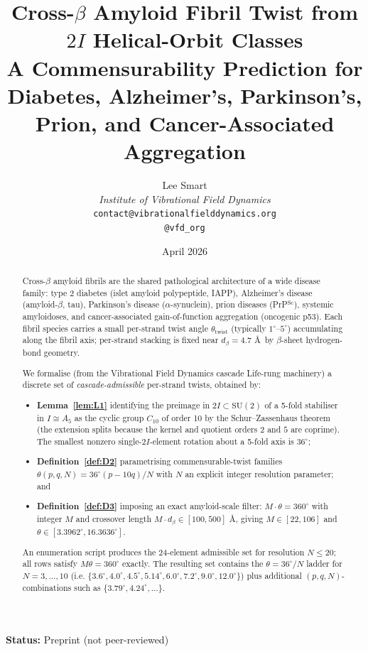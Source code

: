 \documentclass[12pt]{article}
\title{Cross-$\beta$ Amyloid Fibril Twist from $2I$ Helical-Orbit Classes\\[6pt]
\large A Commensurability Prediction for Diabetes, Alzheimer's, Parkinson's, Prion, and Cancer-Associated Aggregation}
\author{%
  Lee Smart\\[4pt]
  \textit{Institute of Vibrational Field Dynamics}\\[2pt]
  \texttt{contact@vibrationalfielddynamics.org}\\[2pt]
  \texttt{@vfd\_org}%
}
\date{April 2026}
\begin{document}
\maketitle

\noindent\textbf{Status:} Preprint (not peer-reviewed)

\begin{abstract}
Cross-$\beta$ amyloid fibrils are the shared pathological
architecture of a wide disease family: type 2 diabetes (islet
amyloid polypeptide, IAPP), Alzheimer's disease (amyloid-$\beta$,
tau), Parkinson's disease ($\alpha$-synuclein), prion diseases
(PrP$^{\mathrm{Sc}}$), systemic amyloidoses, and cancer-associated
gain-of-function aggregation (oncogenic p53). Each fibril species
carries a small per-strand twist angle $\theta_{\mathrm{twist}}$
(typically $1^{\circ}$--$5^{\circ}$) accumulating along the fibril
axis; per-strand stacking is fixed near $d_\beta = 4.7$ \AA\ by
$\beta$-sheet hydrogen-bond geometry.

We formalise (from the Vibrational Field Dynamics cascade
Life-rung machinery) a discrete set of \emph{cascade-admissible}
per-strand twists, obtained by:

\begin{itemize}
\item \textbf{Lemma~\ref{lem:L1}} identifying the preimage in
  $2I \subset \mathrm{SU}(2)$ of a 5-fold stabiliser in
  $I \cong A_5$ as the cyclic group $C_{10}$ of order 10 by the
  Schur--Zassenhaus theorem (the extension splits because the
  kernel and quotient orders $2$ and $5$ are coprime). The
  smallest nonzero single-$2I$-element rotation about a 5-fold
  axis is $36^{\circ}$;
\item \textbf{Definition~\ref{def:D2}} parametrising
  commensurable-twist families $\theta(p, q, N) = 36^{\circ}
  (p - 10q)/N$ with $N$ an explicit integer resolution
  parameter; and
\item \textbf{Definition~\ref{def:D3}} imposing an exact
  amyloid-scale filter: $M \cdot \theta = 360^{\circ}$ with
  integer $M$ and crossover length $M \cdot d_\beta \in [100, 500]$
  \AA, giving $M \in [22, 106]$ and
  $\theta \in [3.3962^{\circ}, 16.3636^{\circ}]$.
\end{itemize}

An enumeration script produces the $24$-element admissible set
for resolution $N \le 20$; all rows satisfy $M \theta = 360^{\circ}$
exactly. The resulting set contains the $\theta = 36^{\circ}/N$
ladder for $N = 3, \ldots, 10$ (i.e.
$\{3.6^{\circ}, 4.0^{\circ}, 4.5^{\circ}, 5.14^{\circ}, 6.0^{\circ},
7.2^{\circ}, 9.0^{\circ}, 12.0^{\circ}\}$) plus additional
$(p, q, N)$-combinations such as $\{3.79^{\circ}, 4.24^{\circ},
\ldots\}$.


\end{abstract}
\end{document}
